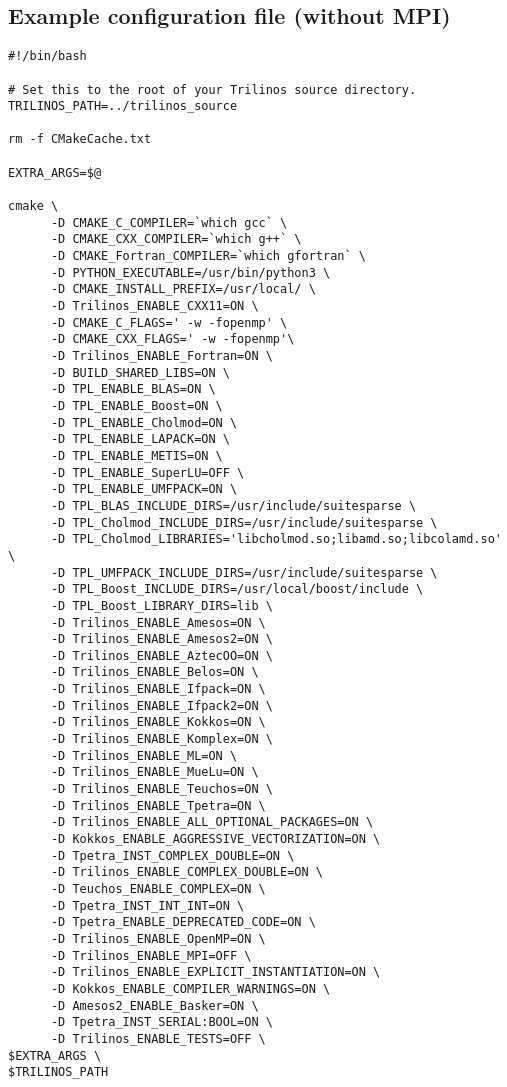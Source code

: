 \subsection{Example configuration file (without MPI)}
\begin{verbatim}
#!/bin/bash

# Set this to the root of your Trilinos source directory.
TRILINOS_PATH=../trilinos_source

rm -f CMakeCache.txt

EXTRA_ARGS=$@

cmake \
      -D CMAKE_C_COMPILER=`which gcc` \
      -D CMAKE_CXX_COMPILER=`which g++` \
      -D CMAKE_Fortran_COMPILER=`which gfortran` \
      -D PYTHON_EXECUTABLE=/usr/bin/python3 \
      -D CMAKE_INSTALL_PREFIX=/usr/local/ \
      -D Trilinos_ENABLE_CXX11=ON \
      -D CMAKE_C_FLAGS=' -w -fopenmp' \
      -D CMAKE_CXX_FLAGS=' -w -fopenmp'\
      -D Trilinos_ENABLE_Fortran=ON \
      -D BUILD_SHARED_LIBS=ON \
      -D TPL_ENABLE_BLAS=ON \
      -D TPL_ENABLE_Boost=ON \
      -D TPL_ENABLE_Cholmod=ON \
      -D TPL_ENABLE_LAPACK=ON \
      -D TPL_ENABLE_METIS=ON \
      -D TPL_ENABLE_SuperLU=OFF \
      -D TPL_ENABLE_UMFPACK=ON \
      -D TPL_BLAS_INCLUDE_DIRS=/usr/include/suitesparse \
      -D TPL_Cholmod_INCLUDE_DIRS=/usr/include/suitesparse \
      -D TPL_Cholmod_LIBRARIES='libcholmod.so;libamd.so;libcolamd.so' \
      -D TPL_UMFPACK_INCLUDE_DIRS=/usr/include/suitesparse \
      -D TPL_Boost_INCLUDE_DIRS=/usr/local/boost/include \
      -D TPL_Boost_LIBRARY_DIRS=lib \
      -D Trilinos_ENABLE_Amesos=ON \
      -D Trilinos_ENABLE_Amesos2=ON \
      -D Trilinos_ENABLE_AztecOO=ON \
      -D Trilinos_ENABLE_Belos=ON \
      -D Trilinos_ENABLE_Ifpack=ON \
      -D Trilinos_ENABLE_Ifpack2=ON \
      -D Trilinos_ENABLE_Kokkos=ON \
      -D Trilinos_ENABLE_Komplex=ON \
      -D Trilinos_ENABLE_ML=ON \
      -D Trilinos_ENABLE_MueLu=ON \
      -D Trilinos_ENABLE_Teuchos=ON \
      -D Trilinos_ENABLE_Tpetra=ON \
      -D Trilinos_ENABLE_ALL_OPTIONAL_PACKAGES=ON \
      -D Kokkos_ENABLE_AGGRESSIVE_VECTORIZATION=ON \
      -D Tpetra_INST_COMPLEX_DOUBLE=ON \
      -D Trilinos_ENABLE_COMPLEX_DOUBLE=ON \
      -D Teuchos_ENABLE_COMPLEX=ON \
      -D Tpetra_INST_INT_INT=ON \
      -D Tpetra_ENABLE_DEPRECATED_CODE=ON \
      -D Trilinos_ENABLE_OpenMP=ON \
      -D Trilinos_ENABLE_MPI=OFF \
      -D Trilinos_ENABLE_EXPLICIT_INSTANTIATION=ON \
      -D Kokkos_ENABLE_COMPILER_WARNINGS=ON \
      -D Amesos2_ENABLE_Basker=ON \
      -D Tpetra_INST_SERIAL:BOOL=ON \
      -D Trilinos_ENABLE_TESTS=OFF \
$EXTRA_ARGS \
$TRILINOS_PATH
\end{verbatim}


